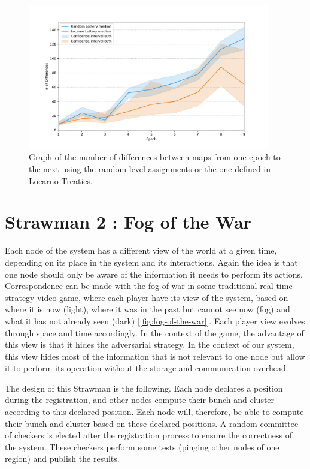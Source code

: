 \documentclass[a4paper,11pt,oneside]{report}
\begin{document}
\begin{figure}[!h] \centering
  \includegraphics[width=300pt]{figures/LocarnoTreaties-differences}
  \caption{Graph of the number of differences between maps from one epoch to
  the next using the random level assignments or the one defined in Locarno
  Treaties. } \label{fig:LocarnoTreaties-differences} \end{figure}

\section{Strawman 2 : Fog of the War} \label{sec:Fog-of-the-war}

Each node of the system has a different view of the world at a given time, depending on its place in the system and its interactions. Again the idea is
that one node should only be aware of the information it needs to perform its
actions. Correspondence can be made with the fog of war in some traditional
real-time strategy video game, where each player have its view of the
system, based on where it is now (light), where it was in the past but cannot
see now (fog) and what it has not already seen (dark)
[\autoref{fig:fog-of-the-war}]. Each player view evolves through space and
time accordingly. In the context of the game, the advantage of this view is
that it hides the adversarial strategy. In the context of our system, this view
hides most of the information that is not relevant to one node but allow it
to perform its operation without the storage and communication overhead. 

The design of this Strawman is the following. Each node declares a
position during the registration, and other nodes compute their bunch and
cluster according to this declared position. Each node will, therefore, be able
to compute their bunch and cluster based on these declared positions. A random committee of checkers is elected after
the registration process to ensure
the correctness of the system. These checkers perform some tests (pinging other
nodes of one region) and publish the results. 
\end{document}
